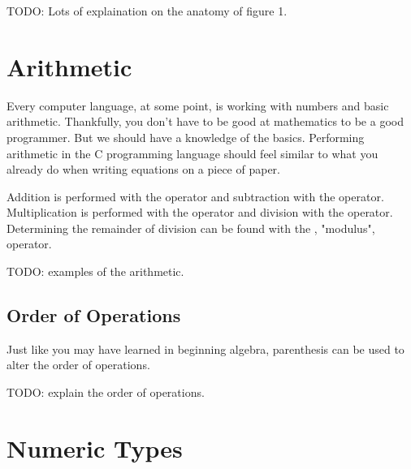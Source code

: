 TODO: Lots of explaination on the anatomy of figure 1.


\section{Arithmetic}

Every computer language, at some point, is working with numbers and basic
arithmetic. Thankfully, you don't have to be good at mathematics to be a good
programmer. But we should have a knowledge of the basics. Performing arithmetic
in the C programming language should feel similar to what you already do when
writing equations on a piece of paper.

Addition is performed with the \ident{+} operator and subtraction with the
\ident{-} operator. Multiplication is performed with the \ident{*} operator and
division with the \ident{/} operator. Determining the remainder of division can
be found with the \ident{\%}, "modulus", operator.

TODO: examples of the arithmetic.

\subsection{Order of Operations}

Just like you may have learned in beginning algebra, parenthesis can be used
to alter the order of operations.

TODO: explain the order of operations.

\section{Numeric Types}

